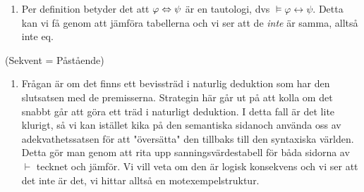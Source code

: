 \begin{enumerate}
\begin{enumerate}
      \item Per definition betyder det att $\varphi\Leftrightarrow\psi$ är en tautologi, dvs $\vDash\varphi\leftrightarrow\psi$. Detta kan vi få genom att jämföra tabellerna och vi ser att de \textit{inte} är samma, alltså inte eq.

    \end{enumerate}
    \par\bigskip
    \noindent (Sekvent = Påstående)
    \par\bigskip

    \begin{enumerate}
      \item Frågan är om det finns ett bevissträd i naturlig deduktion som har den slutsatsen med de premisserna. Strategin här går ut på att kolla om det snabbt går att göra ett träd i naturligt deduktion. I detta fall är det lite klurigt, så vi kan istället kika på den semantiska sidanoch använda oss av adekvathetssatsen för att "översätta" den tillbaks till den syntaxiska världen. Detta gör man genom att rita upp sanningsvärdestabell för båda sidorna av $\vdash$ tecknet och jämför. Vi vill veta om den är logisk konsekvens och vi ser att det inte är det, vi hittar alltså en motexempelstruktur.

    \end{enumerate}

\end{enumerate}
